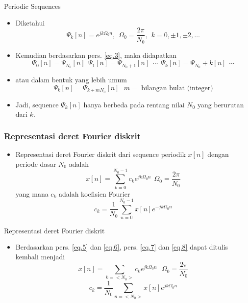 \documentclass[pdflatex,compress,mathserif]{beamer}
\begin{document}
\begin{frame}{Periodic Sequences}
	\begin{itemize}
		\item Diketahui
		\begin{equation}\label{eq.4}
			\Psi_k[n] = e^{j k \Omega_0 n},~~\Omega_0 = \frac{2 \pi}{N_0},~~k = 0,\pm1,\pm2,\dots
		\end{equation}
		\item Kemudian berdasarkan pers. \ref{eq.3}, maka didapatkan
		\begin{equation}\label{eq.5}
			\Psi_0[n] = \Psi_{N_0}[n]~~\Psi_1[n] = \Psi_{N_0 + 1}[n]~~\cdots~~\Psi_k[n] = \Psi_{N_0} + k[n]~~\cdots
		\end{equation}
		\item atau dalam bentuk yang lebih umum
		\begin{equation}\label{eq.6}
			\Psi_k[n] = \Psi_{k+mN_0}[n]~~~m = \text{ bilangan bulat (integer)}
		\end{equation}
		\item Jadi, sequence $ \Psi_k[n] $ hanya berbeda pada rentang nilai $ N_0 $ yang berurutan dari $ k $.
	\end{itemize}
\end{frame}

\begin{frame}
	\frametitle{Representasi deret Fourier diskrit}
	\begin{itemize}
		\item Representasi deret Fourier diskrit dari sequence periodik $ x[n] $ dengan periode dasar $ N_0 $ adalah
		\begin{equation}\label{eq.7}
			x[n] = \sum\limits_{k=0}^{N_0-1} c_k e^{j k \Omega_0 n}~~\Omega_0 = \frac{2 \pi}{N_0}
		\end{equation}
		yang mana $ c_k $ adalah koefisien Fourier
		\begin{equation}\label{eq.8}
			c_k = \frac{1}{N_0} \sum_{n = 0}^{N_0 - 1} x[n] e^{-j k \Omega_0 n}
		\end{equation}
	\end{itemize}
\end{frame}

\begin{frame}{Representasi deret Fourier diskrit}
	\begin{itemize}
		\item Berdasarkan pers. \ref{eq.5} dan \ref{eq.6}, pers. \ref{eq.7} dan \ref{eq.8} dapat ditulis kembali menjadi
		\begin{equation}\label{eq.9}
			x[n] = \sum\limits_{k = <N_0>} c_k e^{jk\Omega_0n}~~~\Omega_0 = \frac{2\pi}{N_0}
		\end{equation}
		\begin{equation}\label{eq.10}
			c_k = \frac{1}{N_0} \sum_{n = <N_0>} x[n]e^{jk\Omega_0n}
		\end{equation}
	\end{itemize}
\end{frame}
\end{document}
